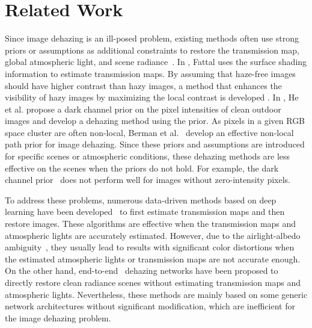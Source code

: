 \documentclass[10pt,twocolumn,letterpaper]{article}
\begin{document}
  \vspace{-1mm}
  \section{Related Work}
  \label{sec:related}
  \vspace{-1mm}
Since image dehazing is an ill-posed problem, existing methods often use strong priors or assumptions as additional constraints to restore the transmission map, global atmospheric light, and scene radiance~\cite{tr_dehaze1,tr_dehaze2,tr_dehaze3,He_dark, NLD}.
In \cite{tr_dehaze1}, Fattal uses the surface shading information to estimate transmission maps.
By assuming that haze-free images should have higher contrast than hazy images, a method that enhances the visibility of hazy images by maximizing the local contrast is developed \cite{tr_dehaze2}.
In \cite{He_dark}, He et al. propose a dark channel prior on the pixel intensities of clean outdoor images and develop a dehazing method using the prior.
As pixels in a given RGB space cluster are often non-local, Berman et al.~\cite{NLD} develop an effective non-local path prior for image dehazing.
Since these priors and assumptions are introduced for specific scenes or atmospheric conditions, these dehazing methods are less effective on the scenes when the priors do not hold.
For example, the dark channel prior~\cite{He_dark} does not perform well for images without zero-intensity pixels.


  To address these problems, numerous data-driven methods based on deep learning have been
  developed~\cite{deep_physical1, MSCNN, DCPDN, AOD, PDN, li2018image,DeepPriorsDehaze,deep_physical_unsupervised1,D-DIP} to first estimate transmission maps and then restore images.
These algorithms are effective when the transmission maps and atmospheric lights are accurately estimated.
However, due to the airlight-albedo ambiguity~\cite{VHaze}, they usually lead to results with significant color distortions when the estimated atmospheric lights or transmission maps are not accurate enough.
On the other hand, end-to-end~\cite{DcGAN, GFN, MsPPN, PFFNet, GCANet, DuRN, griddehazenet, Pix2pixHaze, RI-GAN}
  dehazing networks have been proposed to directly restore clean radiance scenes without estimating transmission maps and atmospheric lights.
Nevertheless, these methods are mainly based on some generic network architectures without significant modification, which are inefficient for the image dehazing problem.
  
\end{document}
